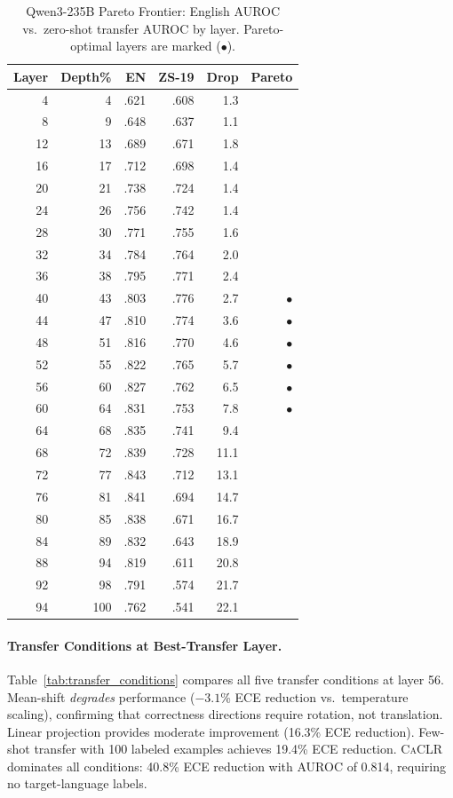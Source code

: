 \documentclass[11pt,a4paper]{article}
\newcommand{\caclr}{\textsc{CaCLR}}
\begin{document}
\begin{table}[t]
\centering
\small
\caption{Qwen3-235B Pareto Frontier: English AUROC vs.\ zero-shot transfer AUROC by layer. Pareto-optimal layers are marked ($\bullet$).}
\label{tab:pareto_qwen3}
\begin{tabular}{rrrrrr}
\toprule
Layer & Depth\% & EN & ZS-19 & Drop & Pareto \\
\midrule
4 & 4 & .621 & .608 & 1.3 & \\
8 & 9 & .648 & .637 & 1.1 & \\
12 & 13 & .689 & .671 & 1.8 & \\
16 & 17 & .712 & .698 & 1.4 & \\
20 & 21 & .738 & .724 & 1.4 & \\
24 & 26 & .756 & .742 & 1.4 & \\
28 & 30 & .771 & .755 & 1.6 & \\
32 & 34 & .784 & .764 & 2.0 & \\
36 & 38 & .795 & .771 & 2.4 & \\
40 & 43 & .803 & .776 & 2.7 & $\bullet$ \\
44 & 47 & .810 & .774 & 3.6 & $\bullet$ \\
48 & 51 & .816 & .770 & 4.6 & $\bullet$ \\
52 & 55 & .822 & .765 & 5.7 & $\bullet$ \\
56 & 60 & .827 & .762 & 6.5 & $\bullet$ \\
60 & 64 & .831 & .753 & 7.8 & $\bullet$ \\
64 & 68 & .835 & .741 & 9.4 & \\
68 & 72 & .839 & .728 & 11.1 & \\
72 & 77 & .843 & .712 & 13.1 & \\
76 & 81 & .841 & .694 & 14.7 & \\
80 & 85 & .838 & .671 & 16.7 & \\
84 & 89 & .832 & .643 & 18.9 & \\
88 & 94 & .819 & .611 & 20.8 & \\
92 & 98 & .791 & .574 & 21.7 & \\
94 & 100 & .762 & .541 & 22.1 & \\
\bottomrule
\end{tabular}
\end{table}

\paragraph{Transfer Conditions at Best-Transfer Layer.}
Table~\ref{tab:transfer_conditions} compares all five transfer conditions at layer 56. Mean-shift \emph{degrades} performance ($-3.1$\% ECE reduction vs.\ temperature scaling), confirming that correctness directions require rotation, not translation. Linear projection provides moderate improvement (16.3\% ECE reduction). Few-shot transfer with 100 labeled examples achieves 19.4\% ECE reduction. \caclr{} dominates all conditions: 40.8\% ECE reduction with AUROC of 0.814, requiring no target-language labels.
\end{document}
